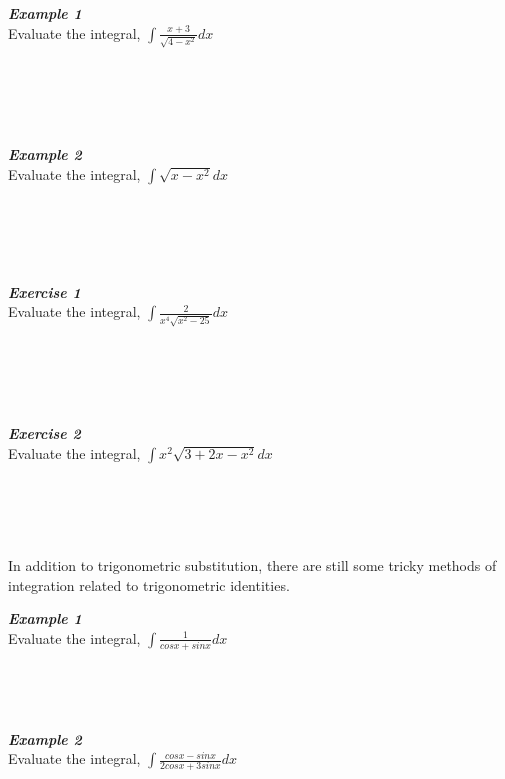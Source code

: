 \documentclass[12px]{article}
\begin{document}
\begin{enumerate}
    \begin{multicols}{2}
        \textit{\textbf{Example 1}}\\
        Evaluate the integral, $\int\frac{x+3}{\sqrt{4-x^2}}dx$\\
        \\
        \\
        \\
        \\
        \\
        \textit{\textbf{Example 2}}\\
        Evaluate the integral, $\int\sqrt{x-x^2}dx$\\
        \\
        \\
        \\
        \\
        \\
        \textit{\textbf{Exercise 1}}\\
        Evaluate the integral, $\int\frac{2}{x^4\sqrt{x^2-25}}dx$\\
        \\
        \\
        \\
        \\
        \\
        \textit{\textbf{Exercise 2}}\\
        Evaluate the integral, $\int x^2\sqrt{3+2x-x^2}dx$\\
        \\
        \\
        \\
        \\
    \end{multicols}
    \hspace*{2em}In addition to trigonometric substitution, there are still some tricky methods of integration related to trigonometric identities.\\
    \begin{multicols}{2}
        \textit{\textbf{Example 1}}\\
        Evaluate the integral, $\int\frac{1}{cosx+sinx}dx$\\
        \\
        \\
        \\
        \\
        \textit{\textbf{Example 2}}\\
        Evaluate the integral, $\int\frac{cosx-sinx}{2cosx+3sinx}dx$\\

\end{multicols}
\end{enumerate}
\end{document}
